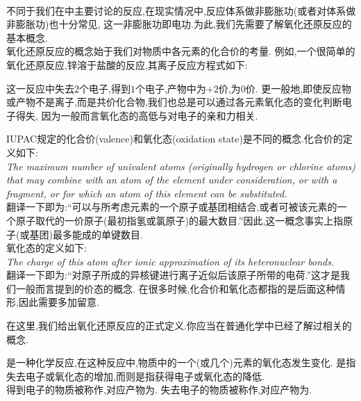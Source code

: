 \documentclass{ctexart}
\begin{document}
\pagestyle{plain}
\noindent{}\vspace{15pt}\\
\indent 不同于我们在中主要讨论的反应,在现实情况中,反应体系做非膨胀功(或者对体系做非膨胀功)也十分常见,%
这一非膨胀功即电功.为此,我们先需要了解氧化还原反应的基本概念.\vspace{12pt}\\
\indent 氧化还原反应的概念始于我们对物质中各元素的化合价的考量.%
例如,一个很简单的氧化还原反应,锌溶于盐酸的反应,其离子反应方程式如下:
\begin{tightcenter}
\end{tightcenter}
这一反应中失去$2$个电子,得到$1$个电子,产物中为$+2$价,为$0$价.%
更一般地,即使反应物或产物不是离子,而是共价化合物,我们也总是可以通过各元素氧化态的变化判断电子得失,%
因为一般而言氧化态的高低与对电子的亲和力相关.
\begin{hint}
    IUPAC规定的化合价(valence)和氧化态(oxidation state)是不同的概念.化合价的定义如下:\\
    \textit{The maximum number of univalent atoms (originally hydrogen or chlorine atoms) that may combine with an atom of the element under consideration, or with a fragment, or for which an atom of this element can be substituted.}\\
    翻译一下即为:“可以与所考虑元素的一个原子或基团相结合,或者可被该元素的一个原子取代的一价原子(最初指氢或氯原子)的最大数目.”因此,这一概念事实上指原子(或基团)最多能成的单键数目.\\
    氧化态的定义如下:\\
    \textit{The charge of this atom after ionic approximation of its heteronuclear bonds.}\\
    翻译一下即为:“对原子所成的异核键进行离子近似后该原子所带的电荷.”这才是我们一般而言提到的价态的概念.%
    在很多时候,化合价和氧化态都指的是后面这种情形,因此需要多加留意.
\end{hint}
\indent 在这里,我们给出氧化还原反应的正式定义.你应当在普通化学中已经了解过相关的概念.
\begin{definition}[6B.1.1 氧化还原反应]
    是一种化学反应,在这种反应中,物质中的一个(或几个)元素的氧化态发生变化.%
    是指失去电子或氧化态的增加,而则是指获得电子或氧化态的降低.\\
    得到电子的物质被称作,对应产物为.%
    失去电子的物质被称作,对应产物为.
\end{definition}
\end{document}
